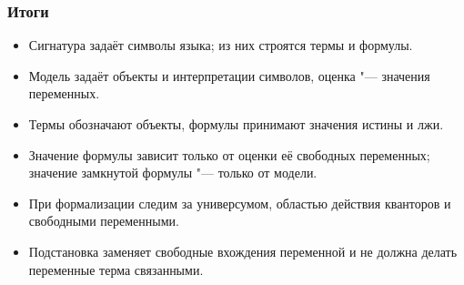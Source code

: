 \documentclass[10pt]{beamer}
\begin{document}
\begin{frame}
    \frametitle{Итоги}
    \begin{itemize}
        \item Сигнатура задаёт символы языка; из них строятся термы и формулы.
        \item Модель задаёт объекты и интерпретации символов, оценка "--- значения переменных.
        \item Термы обозначают объекты, формулы принимают значения истины и лжи.
        \item Значение формулы зависит только от оценки её свободных переменных; значение замкнутой формулы "--- только от модели.
        \item При формализации следим за универсумом, областью действия кванторов и свободными переменными.
        \item Подстановка заменяет свободные вхождения переменной и не должна делать переменные терма связанными.
    \end{itemize}
\end{frame}
\end{document}
